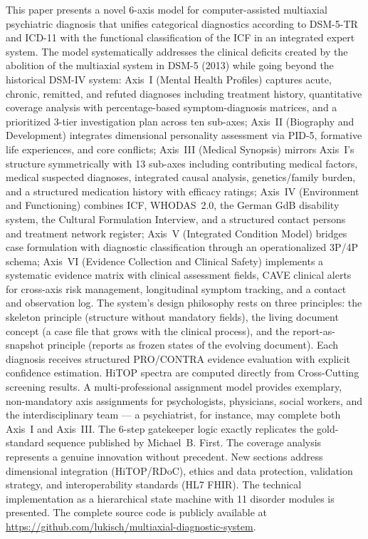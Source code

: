 \documentclass[11pt,a4paper]{article}
\begin{document}
This paper presents a novel 6-axis model for computer-assisted multiaxial psychiatric diagnosis that unifies categorical diagnostics according to DSM-5-TR and ICD-11 with the functional classification of the ICF in an integrated expert system. The model systematically addresses the clinical deficits created by the abolition of the multiaxial system in DSM-5 (2013) while going beyond the historical DSM-IV system: Axis~I (Mental Health Profiles) captures acute, chronic, remitted, and refuted diagnoses including treatment history, quantitative coverage analysis with percentage-based symptom-diagnosis matrices, and a prioritized 3-tier investigation plan across ten sub-axes; Axis~II (Biography and Development) integrates dimensional personality assessment via PID-5, formative life experiences, and core conflicts; Axis~III (Medical Synopsis) mirrors Axis~I's structure symmetrically with 13 sub-axes including contributing medical factors, medical suspected diagnoses, integrated causal analysis, genetics/family burden, and a structured medication history with efficacy ratings; Axis~IV (Environment and Functioning) combines ICF, WHODAS~2.0, the German GdB disability system, the Cultural Formulation Interview, and a structured contact persons and treatment network register; Axis~V (Integrated Condition Model) bridges case formulation with diagnostic classification through an operationalized 3P/4P schema; Axis~VI (Evidence Collection and Clinical Safety) implements a systematic evidence matrix with clinical assessment fields, CAVE clinical alerts for cross-axis risk management, longitudinal symptom tracking, and a contact and observation log. The system's design philosophy rests on three principles: the skeleton principle (structure without mandatory fields), the living document concept (a case file that grows with the clinical process), and the report-as-snapshot principle (reports as frozen states of the evolving document). Each diagnosis receives structured PRO/CONTRA evidence evaluation with explicit confidence estimation. HiTOP spectra are computed directly from Cross-Cutting screening results. A multi-professional assignment model provides exemplary, non-mandatory axis assignments for psychologists, physicians, social workers, and the interdisciplinary team --- a psychiatrist, for instance, may complete both Axis~I and Axis~III. The 6-step gatekeeper logic exactly replicates the gold-standard sequence published by Michael~B. First. The coverage analysis represents a genuine innovation without precedent. New sections address dimensional integration (HiTOP/RDoC), ethics and data protection, validation strategy, and interoperability standards (HL7 FHIR). The technical implementation as a hierarchical state machine with 11 disorder modules is presented. The complete source code is publicly available at \url{https://github.com/lukisch/multiaxial-diagnostic-system}.
\end{document}
